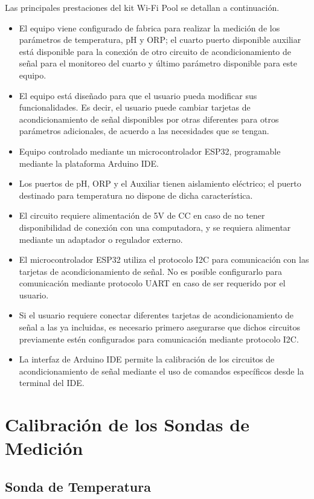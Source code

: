 Las principales prestaciones del kit Wi-Fi Pool se detallan a continuación.

\begin{itemize}
    \item El equipo viene configurado de fabrica para realizar la medición de los parámetros de temperatura, pH y ORP; el cuarto puerto disponible auxiliar está disponible para la conexión de otro circuito de acondicionamiento 
    de señal para el monitoreo del cuarto y último parámetro disponible para este equipo.
    \item El equipo está diseñado para que el usuario pueda modificar sus funcionalidades. Es decir, el usuario puede cambiar tarjetas de acondicionamiento de señal disponibles por otras diferentes para otros parámetros adicionales,
    de acuerdo a las necesidades que se tengan.
    \item Equipo controlado mediante un microcontrolador ESP32, programable mediante la plataforma Arduino IDE.
    \item Los puertos de pH, ORP y el Auxiliar tienen aislamiento eléctrico; el puerto destinado para temperatura no dispone de dicha característica.
    \item El circuito requiere alimentación de 5V de CC en caso de no tener disponibilidad de conexión con una computadora, y se requiera alimentar mediante un adaptador o regulador externo.
    \item El microcontrolador ESP32 utiliza el protocolo I2C para comunicación con las tarjetas de acondicionamiento de señal. No es posible configurarlo para comunicación mediante protocolo UART en caso de ser 
    requerido por el usuario.
    \item Si el usuario requiere conectar diferentes tarjetas de acondicionamiento de señal a las ya incluidas, es necesario primero asegurarse que dichos circuitos previamente estén configurados para comunicación mediante 
    protocolo I2C.
    \item La interfaz de Arduino IDE permite la calibración de los circuitos de acondicionamiento de señal mediante el uso de comandos específicos desde la terminal del IDE.
\end{itemize}

\section{Calibración de los Sondas de Medición}

\subsection{Sonda de Temperatura}

